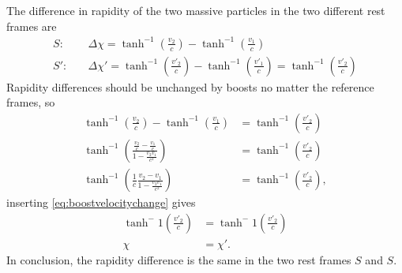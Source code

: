 \documentclass[11pt]{amsart}
\begin{document}
The difference in rapidity of the two massive particles in the two different rest frames are
\begin{align}
S: &\quad \Delta\chi = \tanh^{-1}\left(\frac{v_2}{c}\right) - \tanh^{-1}\left(\frac{v_1}{c}\right) \\
S':&\quad \Delta\chi' = \tanh^{-1}\left(\frac{v'_2}{c}\right) - \tanh^{-1}\left(\frac{v'_1}{c}\right) = \tanh^{-1}\left(\frac{v'_2}{c}\right)
\end{align}
Rapidity differences should be unchanged by boosts no matter the reference frames, so
\begin{align*}
\tanh^{-1}\left(\frac{v_2}{c}\right) - \tanh^{-1}\left(\frac{v_1}{c}\right) &= \tanh^{-1}\left(\frac{v'_2}{c}\right) \\
\tanh^{-1}\left(\frac{\frac{v_2}{c}-\frac{v_1}{c}}{1-\frac{v_2v_1}{c^2}} \right) &= \tanh^{-1}\left(\frac{v'_2}{c}\right) \\
\tanh^{-1}\left(\frac{1}{c}\frac{v_2-v_1}{1-\frac{v_2v_1}{c^2}} \right) &= \tanh^{-1}\left(\frac{v'_2}{c}\right),
\end{align*}
inserting \ref{eq:boostvelocitychange} gives
\begin{align*}
\tanh^-1\left(\frac{v'_2}{c} \right) &= \tanh^-1\left(\frac{v'_2}{c} \right) \\
\chi &= \chi'.
\end{align*}
In conclusion, the rapidity difference is the same in the two rest frames $S$ and $S$.
\end{document}
